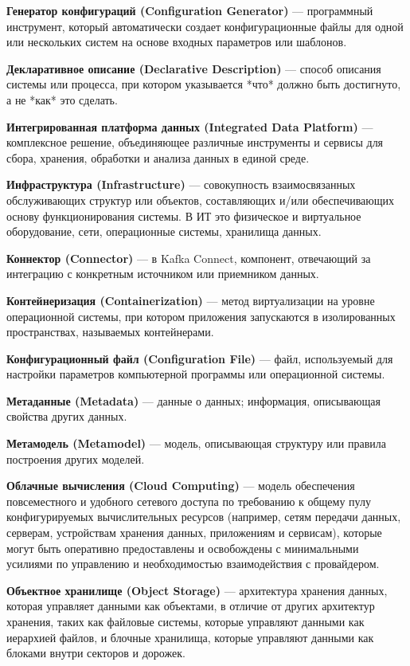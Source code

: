 \textbf{Генератор конфигураций (Configuration Generator)} --- программный инструмент, который автоматически создает конфигурационные файлы для одной или нескольких систем на основе входных параметров или шаблонов.

\textbf{Декларативное описание (Declarative Description)} --- способ описания системы или процесса, при котором указывается *что* должно быть достигнуто, а не *как* это сделать.

\textbf{Интегрированная платформа данных (Integrated Data Platform)} --- комплексное решение, объединяющее различные инструменты и сервисы для сбора, хранения, обработки и анализа данных в единой среде.

\textbf{Инфраструктура (Infrastructure)} --- совокупность взаимосвязанных обслуживающих структур или объектов, составляющих и/или обеспечивающих основу функционирования системы. В ИТ это физическое и виртуальное оборудование, сети, операционные системы, хранилища данных.

\textbf{Коннектор (Connector)} --- в Kafka Connect, компонент, отвечающий за интеграцию с конкретным источником или приемником данных.

\textbf{Контейнеризация (Containerization)} --- метод виртуализации на уровне операционной системы, при котором приложения запускаются в изолированных пространствах, называемых контейнерами.

\textbf{Конфигурационный файл (Configuration File)} --- файл, используемый для настройки параметров компьютерной программы или операционной системы.

\textbf{Метаданные (Metadata)} --- данные о данных; информация, описывающая свойства других данных.

\textbf{Метамодель (Metamodel)} --- модель, описывающая структуру или правила построения других моделей.

\textbf{Облачные вычисления (Cloud Computing)} --- модель обеспечения повсеместного и удобного сетевого доступа по требованию к общему пулу конфигурируемых вычислительных ресурсов (например, сетям передачи данных, серверам, устройствам хранения данных, приложениям и сервисам), которые могут быть оперативно предоставлены и освобождены с минимальными усилиями по управлению и необходимостью взаимодействия с провайдером.

\textbf{Объектное хранилище (Object Storage)} --- архитектура хранения данных, которая управляет данными как объектами, в отличие от других архитектур хранения, таких как файловые системы, которые управляют данными как иерархией файлов, и блочные хранилища, которые управляют данными как блоками внутри секторов и дорожек.


